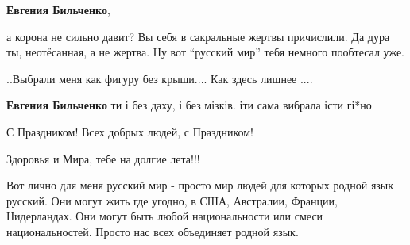 \begin{itemize}
\begin{itemize}
\textbf{Евгения Бильченко}, 

а корона не сильно давит? Вы себя в сакральные жертвы причислили. Да дура ты,
неотёсанная, а не жертва. Ну вот \enquote{русский мир} тебя немного пообтесал уже.

..Выбрали меня как фигуру без крыши.... Как здесь лишнее ....

\textbf{Евгения Бильченко} ти і без даху, і без мізків. іти сама вибрала істи гі*но
\end{itemize} %

С Праздником! Всех добрых людей, с Праздником!

Здоровья и Мира, тебе на долгие лета!!!


Вот лично для меня русский мир - просто мир людей для которых родной язык
русский. Они могут жить где угодно, в США, Австралии, Франции, Нидерландах. Они
могут быть любой национальности или смеси национальностей. Просто нас всех
объединяет родной язык.

\end{itemize} %
